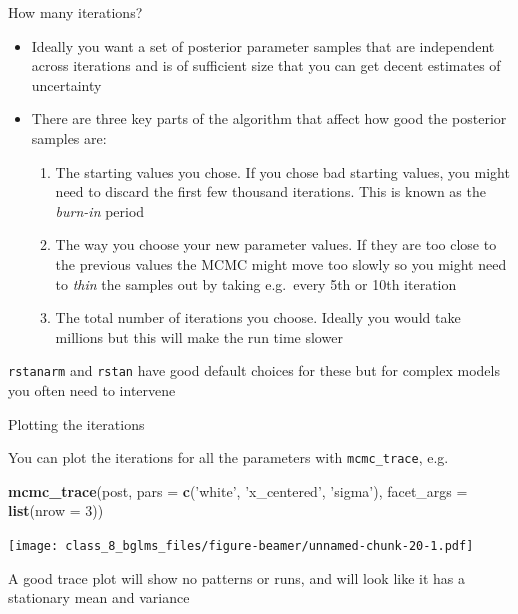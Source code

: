 \documentclass[ignorenonframetext,]{beamer}
\newenvironment{Shaded}{\begin{snugshade}}{\end{snugshade}}
\newcommand{\KeywordTok}[1]{\textcolor[rgb]{0.13,0.29,0.53}{\textbf{#1}}}
\newcommand{\DataTypeTok}[1]{\textcolor[rgb]{0.13,0.29,0.53}{#1}}
\newcommand{\DecValTok}[1]{\textcolor[rgb]{0.00,0.00,0.81}{#1}}
\newcommand{\StringTok}[1]{\textcolor[rgb]{0.31,0.60,0.02}{#1}}
\newcommand{\NormalTok}[1]{#1}
\providecommand{\tightlist}{%
  \setlength{\itemsep}{0pt}\setlength{\parskip}{0pt}}
\begin{document}
\begin{frame}[fragile]{How many iterations?}

\begin{itemize}
\item
  Ideally you want a set of posterior parameter samples that are
  independent across iterations and is of sufficient size that you can
  get decent estimates of uncertainty
\item
  There are three key parts of the algorithm that affect how good the
  posterior samples are:

  \begin{enumerate}
  \def\labelenumi{\arabic{enumi}.}
  \tightlist
  \item
    The starting values you chose. If you chose bad starting values, you
    might need to discard the first few thousand iterations. This is
    known as the \emph{burn-in} period
  \item
    The way you choose your new parameter values. If they are too close
    to the previous values the MCMC might move too slowly so you might
    need to \emph{thin} the samples out by taking e.g.~every 5th or 10th
    iteration
  \item
    The total number of iterations you choose. Ideally you would take
    millions but this will make the run time slower
  \end{enumerate}
\end{itemize}

\texttt{rstanarm} and \texttt{rstan} have good default choices for these
but for complex models you often need to intervene

\end{frame}

\begin{frame}[fragile]{Plotting the iterations}

You can plot the iterations for all the parameters with
\texttt{mcmc\_trace}, e.g.

\begin{Shaded}
\begin{Highlighting}[]
\KeywordTok{mcmc_trace}\NormalTok{(post, }\DataTypeTok{pars =} \KeywordTok{c}\NormalTok{(}\StringTok{'white'}\NormalTok{, }\StringTok{'x_centered'}\NormalTok{, }\StringTok{'sigma'}\NormalTok{),}
           \DataTypeTok{facet_args =} \KeywordTok{list}\NormalTok{(}\DataTypeTok{nrow =} \DecValTok{3}\NormalTok{))}
\end{Highlighting}
\end{Shaded}

\texttt{[image: class\_8\_bglms\_files/figure-beamer/unnamed-chunk-20-1.pdf]}

A good trace plot will show no patterns or runs, and will look like it
has a stationary mean and variance

\end{frame}
\end{document}
